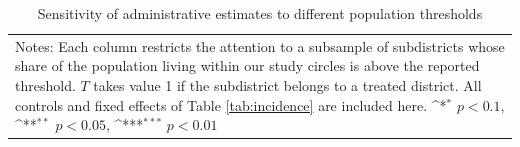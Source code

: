 \begin{table}[h!]
    \centering
    \caption{Sensitivity of survey results to the addition of controls and FDR-adjusted p-values}
    \footnotesize
    
    \label{tab:all_ols}
\end{table}







\begin{table}[h!]
    \centering
    \caption{Placebo regressions: Sleeping under bednet at baseline and concerns about COVID-19 after the campaign}
    \footnotesize
    \hspace*{-0.6cm}
    
    \label{tab:placebos}
\end{table}


%    



\begin{table}[h!]
    \centering
    \caption{Robustness to n. of survey waves: Bednet use and symptoms during the campaign }
    \footnotesize
    \hspace*{-1.2cm}
    
    \label{tab:bednets_fever_bywaves}
\end{table}




\begin{table}[h!]
    \centering
    \caption{Sensitivity of administrative estimates to different population thresholds}
    \footnotesize
    {
\def\sym#1{\ifmmode^{#1}\else\(^{#1}\)\fi}
\begin{tabular}{l*{8}{c}}
\hline\hline
 \vspace{-0.4cm} \\ 
\hline\hline
\multicolumn{9}{p{0.92\linewidth}}{\scriptsize Notes: Each column restricts the attention to a subsample of subdistricts whose share of the population living within our study circles is above the reported threshold. \(T\) takes value 1 if the subdistrict belongs to a treated district. All controls and fixed effects of Table \ref{tab:incidence} are included here. \sym{*} \(p<0.1\), \sym{**} \(p<0.05\), \sym{***} \(p<0.01\)}\\
\end{tabular}
}
\label{tab:dd_sensitivity}
\end{table}


